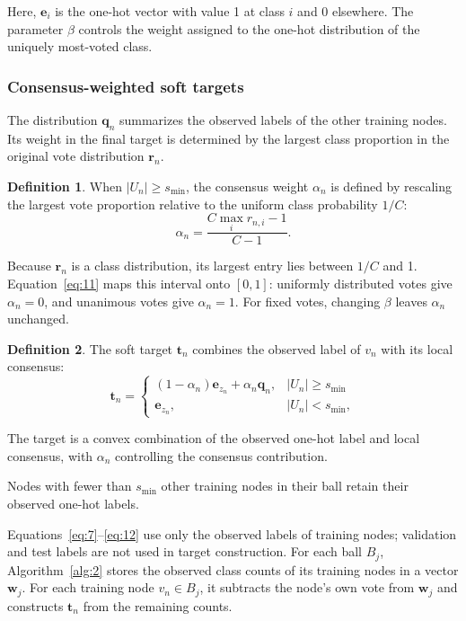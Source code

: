 \documentclass[times,review,10pt]{elsarticle}
\theoremstyle{definition}
\newtheorem{definition}{Definition}
\theoremstyle{plain}
\begin{document}
Here, \(\mathbf e_i\) is the one-hot vector with value 1 at class \(i\) and 0 elsewhere. The parameter \(\beta\) controls the weight assigned to the one-hot distribution of the uniquely most-voted class.

\subsubsection{Consensus-weighted soft targets}\label{sec:3.3.2}

The distribution \(\mathbf q_n\) summarizes the observed labels of the other training nodes. Its weight in the final target is determined by the largest class proportion in the original vote distribution \(\mathbf r_n\).

\begin{definition}
When \(|U_n|\geq s_{\min}\), the consensus weight \(\alpha_n\) is defined by rescaling the largest vote proportion relative to the uniform class probability \(1/C\):
\begin{equation}\label{eq:11}
\alpha_n=\frac{C\max_i r_{n,i}-1}{C-1}.
\end{equation}
\end{definition}

Because \(\mathbf r_n\) is a class distribution, its largest entry lies between \(1/C\) and 1. Equation~\eqref{eq:11} maps this interval onto \([0,1]\): uniformly distributed votes give \(\alpha_n=0\), and unanimous votes give \(\alpha_n=1\). For fixed votes, changing \(\beta\) leaves \(\alpha_n\) unchanged.

\begin{definition}
The soft target \(\mathbf t_n\) combines the observed label of \(v_n\) with its local consensus:
\begin{equation}\label{eq:12}
\mathbf t_n=
\begin{cases}
(1-\alpha_n)\mathbf e_{z_n}+\alpha_n\mathbf q_n,&|U_n|\geq s_{\min}\\
\mathbf e_{z_n},&|U_n|<s_{\min},
\end{cases}
\end{equation}
\end{definition}

The target is a convex combination of the observed one-hot label and local consensus, with \(\alpha_n\) controlling the consensus contribution.

Nodes with fewer than \(s_{\min}\) other training nodes in their ball retain their observed one-hot labels.

Equations~\eqref{eq:7}--\eqref{eq:12} use only the observed labels of training nodes; validation and test labels are not used in target construction. For each ball \(B_j\), Algorithm~\ref{alg:2} stores the observed class counts of its training nodes in a vector \(\mathbf w_j\). For each training node \(v_n\in B_j\), it subtracts the node's own vote from \(\mathbf w_j\) and constructs \(\mathbf t_n\) from the remaining counts.
\end{document}
